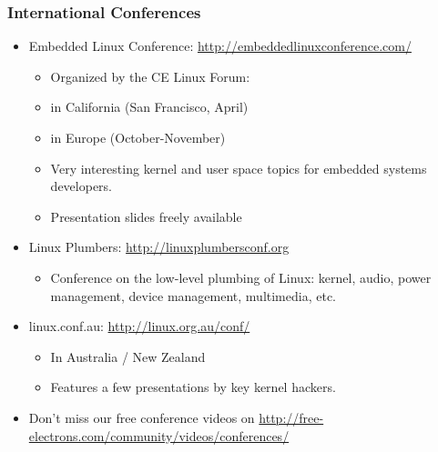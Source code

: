 \begin{frame}
  \frametitle{International Conferences}
  \begin{itemize}
  \item Embedded Linux Conference: \url{http://embeddedlinuxconference.com/}
    \begin{itemize}
    \item Organized by the CE Linux Forum:
    \item in California (San Francisco, April)
    \item in Europe (October-November)
    \item Very interesting kernel and user space topics for embedded
      systems developers.
    \item Presentation slides freely available
    \end{itemize}
  \item Linux Plumbers: \url{http://linuxplumbersconf.org}
    \begin{itemize}
    \item Conference on the low-level plumbing of Linux: kernel,
      audio, power management, device management, multimedia, etc.
    \end{itemize}
  \item linux.conf.au: \url{http://linux.org.au/conf/}
    \begin{itemize}
    \item In Australia / New Zealand
    \item Features a few presentations by key kernel hackers.
    \end{itemize}
  \item Don't miss our free conference videos on
    \url{http://free-electrons.com/community/videos/conferences/}
  \end{itemize}
\end{frame}

